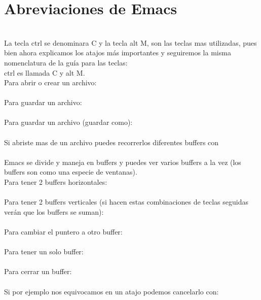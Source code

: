 \chapter{Abreviaciones de Emacs}\label{aped.B}\\

La tecla ctrl se denominara C y la tecla alt M, son las teclas mas utilizadas, pues bien ahora explicamos los atajos más importantes y seguiremos la misma nomenclatura de la guía para las teclas:\\

ctrl es llamada C y alt M.\\

Para abrir o crear un archivo:\\
\\

Para guardar un archivo:\\
\\

Para guardar un archivo (guardar como):\\
\\

Si abriste mas de un archivo puedes recorrerlos diferentes buffers con\\
\\

Emacs se divide y maneja en buffers y puedes ver varios buffers a la vez (los buffers son como una especie de ventanas).\\

Para tener 2 buffers horizontales:\\
\\

Para tener 2 buffers verticales (si hacen estas combinaciones de teclas seguidas verán que los buffers se suman):\\
\\

Para cambiar el puntero a otro buffer:\\
\\

Para tener un solo buffer:\\
\\

Para cerrar un buffer:\\
\\

Si por ejemplo nos equivocamos en un atajo podemos cancelarlo con:\\
\\

